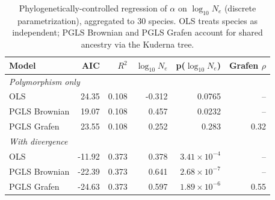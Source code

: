 \begin{table}[H]
\centering
\begin{tabular}{lrrrrr}
\toprule
Model & AIC & $R^2$ & $\log_{10}N_e$ & p($\log_{10}N_e$) & Grafen $\rho$ \\
\midrule
\multicolumn{6}{l}{\emph{Polymorphism only}} \\
OLS & 24.35 & 0.108 & -0.312 & 0.0765 & --
\\
PGLS Brownian & 19.07 & 0.108 & 0.457 & 0.0232 & --
\\
PGLS Grafen & 23.55 & 0.108 & 0.252 & 0.283 & 0.32
\\
\midrule
\multicolumn{6}{l}{\emph{With divergence}} \\
OLS & -11.92 & 0.373 & 0.378 & $3.41\times10^{-4}$ & --
\\
PGLS Brownian & -22.39 & 0.373 & 0.641 & $2.68\times10^{-7}$ & --
\\
PGLS Grafen & -24.63 & 0.373 & 0.597 & $1.89\times10^{-6}$ & 0.55
\\
\bottomrule
\end{tabular}
\caption{Phylogenetically-controlled regression of $\alpha$ on $\log_{10}N_e$ (discrete parametrization), aggregated to 30 species. OLS treats species as independent; PGLS Brownian and PGLS Grafen account for shared ancestry via the Kuderna tree.}
\label{tab:divergence_pgls_discrete}
\end{table}

